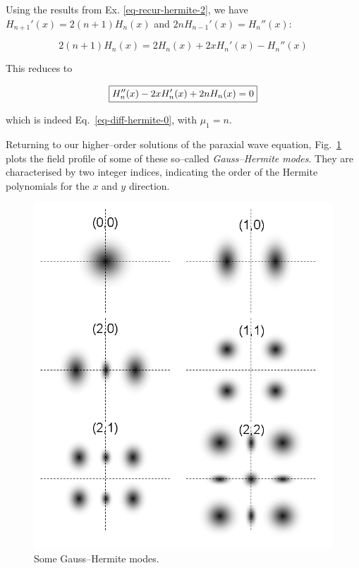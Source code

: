 Using the results from  Ex. \ref{eq-recur-hermite-2}, we have $H_{n+1}'(x) = 2(n+1)H_n(x)$ and $2 n H_{n-1}'(x) = H_n''(x)$:

\begin{equation}
2(n+1)H_n(x) = 2  H_n(x) + 2 x H_n'(x)- H_n''(x)
\end{equation} 

This reduces to

\begin{equation}
\fbox{$\displaystyle
H_n''(x) - 2 x H_n'(x) + 2n H_n(x) = 0 \label{eq-diff-hermite-1}
$}
\end{equation} 

which is indeed Eq.~\ref{eq-diff-hermite-0}, with $\mu_1=n$.

Returning to our higher--order solutions of the paraxial wave equation, Fig.~\ref{fig-gauss-hermite} plots the field profile of some of these so--called \emph{Gauss--Hermite modes}. They are characterised by two integer indices, indicating the order of the Hermite polynomials for the $x$ and $y$ direction.

\begin{figure}
\centering
\includegraphics[scale=0.5]{special/figures/gauss}
\caption{Some Gauss--Hermite modes.}
\label{fig-gauss-hermite}
\end{figure}

